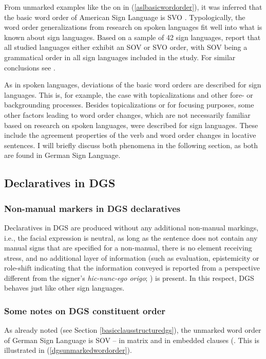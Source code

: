 \noindent From unmarked examples like the on in (\ref{aslbasicwordorder}), it was inferred that the basic word order of American Sign Language is SVO \citep{fischer1975influences}. Typologically, the word order generalizations from research on spoken languages fit well into what is known about sign languages. Based on a sample of 42 sign languages, \citet{napoli2014order} report that all studied languages either exhibit an SOV or SVO order, with SOV being a grammatical order in all sign languages included in the study. For similar conclusions see \citet{kimmelman2012word}.

As in spoken languages, deviations of the basic word orders are described for sign languages. This is, for example, the case with topicalizations and other fore- or backgrounding processes. Besides topicalizations or for focusing purposes, some other factors leading to word order changes, which are not necessarily familiar based on research on spoken languages, were described for sign languages. These include the agreement properties of the verb and word order changes in locative sentences. I will briefly discuss both phenomena in the following section, as both are found in German Sign Language.

\subsection{Declaratives in DGS}
\subsubsection{Non-manual markers in DGS declaratives}

Declaratives in DGS are produced without any additional non-manual markings, i.e., the facial expression is neutral, as long as the sentence does not contain any manual signs that are specified for a non-manual, there is no element receiving stress, and no additional layer of information (such as evaluation, epistemicity or role-shift indicating that the information conveyed is reported from a perspective different from the signer's \textit{hic-nunc-ego origo}; \citealt{buhler1934}) is present. In this respect, DGS behaves just like other sign languages.

\subsubsection{Some notes on DGS constituent order}
As already noted (see Section \ref{basicclausstructuredgs}), the unmarked word order of German Sign Language is SOV -- in matrix and in embedded clauses (\citealt{keller1998aspekte, steinbach2013satztypen}. This is illustrated in (\ref{dgsunmarkedwordorder}).


